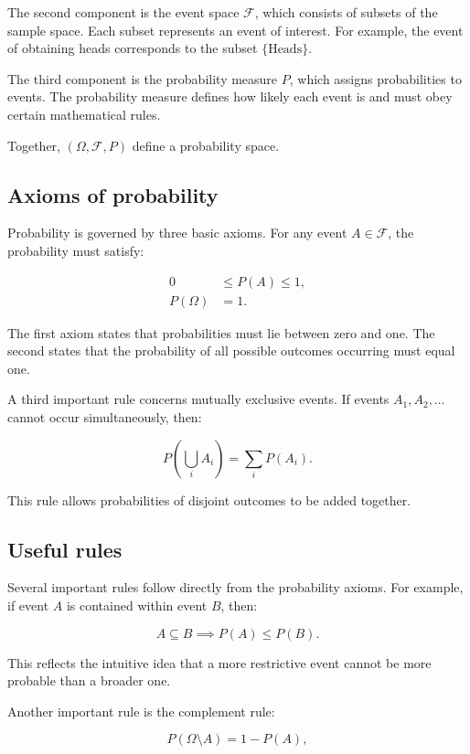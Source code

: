 \documentclass{article}
\begin{document}
The second component is the event space $\mathcal{F}$, which consists of subsets of the sample space. Each subset represents an event of interest. For example, the event of obtaining heads corresponds to the subset $\{\text{Heads}\}$.

The third component is the probability measure $P$, which assigns probabilities to events. The probability measure defines how likely each event is and must obey certain mathematical rules.

Together, $(\Omega, \mathcal{F}, P)$ define a probability space.

\subsection{Axioms of probability}

Probability is governed by three basic axioms. For any event $A \in \mathcal{F}$, the probability must satisfy:

\begin{align*}
0 &\le P(A) \le 1, \\
P(\Omega) &= 1.
\end{align*}

The first axiom states that probabilities must lie between zero and one. The second states that the probability of all possible outcomes occurring must equal one.

A third important rule concerns mutually exclusive events. If events $A_1, A_2, \dots$ cannot occur simultaneously, then:

\[
P\!\left(\bigcup_i A_i\right) = \sum_i P(A_i).
\]

This rule allows probabilities of disjoint outcomes to be added together.

\subsection{Useful rules}

Several important rules follow directly from the probability axioms. For example, if event $A$ is contained within event $B$, then:

\[
A \subseteq B \implies P(A) \le P(B).
\]

This reflects the intuitive idea that a more restrictive event cannot be more probable than a broader one.

Another important rule is the complement rule:

\[
P(\Omega \setminus A) = 1 - P(A),
\]
\end{document}
